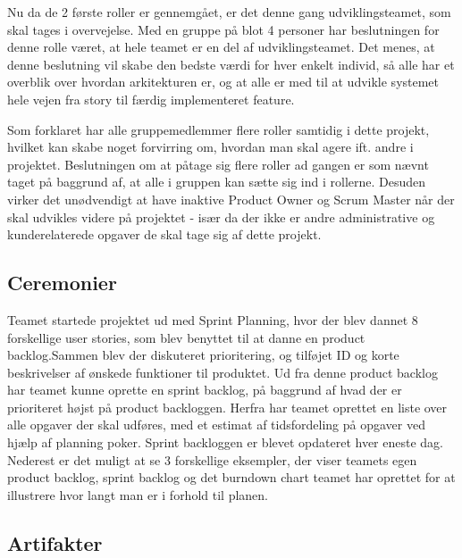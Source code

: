 Nu da de 2 første roller er gennemgået, er det denne gang udviklingsteamet, som skal tages i overvejelse. Med en gruppe på blot 4 personer har beslutningen for denne rolle været, at hele teamet er en del af udviklingsteamet. Det menes, at denne beslutning vil skabe den bedste værdi for hver enkelt individ, så alle har et overblik over hvordan arkitekturen er, og at alle er med til at udvikle systemet hele vejen fra story til færdig implementeret feature.

Som forklaret har alle gruppemedlemmer flere roller samtidig i dette projekt, hvilket kan skabe noget forvirring om, hvordan man skal agere ift. andre i projektet. Beslutningen om at påtage sig flere roller ad gangen er som nævnt taget på baggrund af, at alle i gruppen kan sætte sig ind i rollerne. Desuden virker det unødvendigt at have inaktive Product Owner og Scrum Master når der skal udvikles videre på projektet - især da der ikke er andre administrative og kunderelaterede opgaver de skal tage sig af dette projekt.



\subsection{Ceremonier}

Teamet startede projektet ud med Sprint Planning\cite{ScrumTrenches}, hvor der blev dannet 8 forskellige user stories, som blev benyttet til at danne en product backlog.Sammen blev der diskuteret prioritering, og tilføjet ID og korte beskrivelser af ønskede funktioner til produktet. Ud fra denne product backlog har teamet  kunne oprette en sprint backlog, på baggrund af hvad der er prioriteret højst på product backloggen. Herfra har teamet oprettet en liste over alle opgaver der skal udføres, med et estimat af tidsfordeling på opgaver ved hjælp af planning poker\cite{ScrumTrenches}. Sprint backloggen er blevet opdateret hver eneste dag. Nederest er det muligt at se 3 forskellige eksempler, der viser teamets egen product backlog, sprint backlog og det burndown chart teamet har oprettet for at illustrere hvor langt man er i forhold til planen. 

\subsection{Artifakter}

